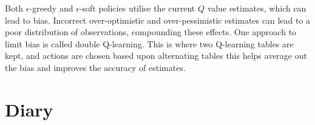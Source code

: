 \documentclass[]{final_report}
\begin{document}
Both $\epsilon$-greedy and $\epsilon$-soft policies utilise the current $Q$ value estimates, which can lead to bias. Incorrect over-optimistic and over-pessimistic estimates can lead to a poor distribution of observations, compounding these effects. One approach to limit bias is called double Q-learning. This is where two Q-learning tables are kept, and actions are chosen based upon alternating tables this helps average out the bias and improves the accuracy of estimates.




\newpage




\appendix

\chapter{Diary}





\label{endpage}
\end{document}
